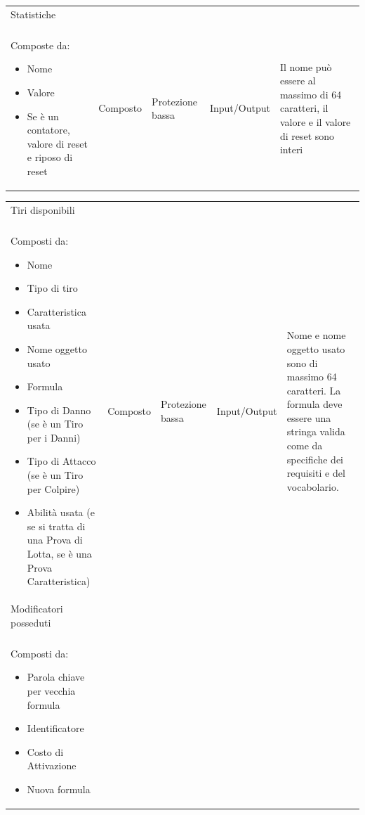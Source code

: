 \documentclass[a4paper, 11pt]{article}
\let\newline\\
\begin{document}
\begin{adjustwidth}{-1.5cm}{-1.5cm}
\begin{center}
\begin{tabular}{|p{4cm}|p{1.5cm}|p{3cm}|p{2.5cm}|p{4cm}|}
        \hline
        Statistiche \newline \newline Composte da: \begin{itemize}
            \item Nome
            \item Valore
            \item Se è un contatore, valore di reset e riposo di reset
        \end{itemize}& Composto & Protezione bassa & Input/Output & Il nome può essere al massimo di 64 caratteri, il valore e il valore di reset sono interi \\
        \hline
    \end{tabular}
    \begin{tabular}{|p{3.5cm}|p{1.5cm}|p{3.5cm}|p{2.5cm}|p{4cm}|}
    \hline
        Tiri disponibili \newline \newline Composti da:
        \begin{itemize}
            \item Nome
            \item Tipo di tiro
            \item Caratteristica usata
            \item Nome oggetto usato
            \item Formula
            \item Tipo di Danno (se è un Tiro per i Danni)
            \item Tipo di Attacco (se è un Tiro per Colpire)
            \item Abilità usata (e se si tratta di una Prova di Lotta, se è una Prova Caratteristica)
        \end{itemize}& Composto & Protezione bassa & Input/Output & Nome e nome oggetto usato sono di massimo 64 caratteri. La formula deve essere una stringa valida come da specifiche dei requisiti e del vocabolario. \\
        \hline
        Modificatori posseduti \newline \newline Composti da:
        \begin{itemize}
            \item Parola chiave per vecchia formula
            \item Identificatore
            \item Costo di Attivazione
            \item Nuova formula

\end{itemize}
\end{tabular}
\end{center}
\end{adjustwidth}
\end{document}
